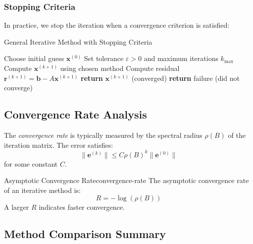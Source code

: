 \subsubsection{Stopping Criteria}
In practice, we stop the iteration when a convergence criterion is satisfied:

\begin{algorithm}
\caption{General Iterative Method with Stopping Criteria}
\begin{algorithmic}[1]
\State Choose initial guess $\mathbf{x}^{(0)}$
\State Set tolerance $\varepsilon > 0$ and maximum iterations $k_{\max}$
    \State Compute $\mathbf{x}^{(k+1)}$ using chosen method
    \State Compute residual $\mathbf{r}^{(k+1)} = \mathbf{b} - A\mathbf{x}^{(k+1)}$
        \State \textbf{return} $\mathbf{x}^{(k+1)}$ (converged)
    \EndIf
\EndFor
\State \textbf{return} failure (did not converge)
\end{algorithmic}
\end{algorithm}

\subsection{Convergence Rate Analysis}

The \emph{convergence rate} is typically measured by the spectral radius $\rho(B)$ of the iteration matrix. The error satisfies:
\begin{equation}
    \|\mathbf{e}^{(k)}\| \leq C \rho(B)^k \|\mathbf{e}^{(0)}\|
\end{equation}
for some constant $C$.

\begin{definition}{Asymptotic Convergence Rate}{convergence-rate}
    The asymptotic convergence rate of an iterative method is:
    \begin{equation}
        R = -\log(\rho(B))
    \end{equation}
    A larger $R$ indicates faster convergence.
\end{definition}

\subsection{Method Comparison Summary}

